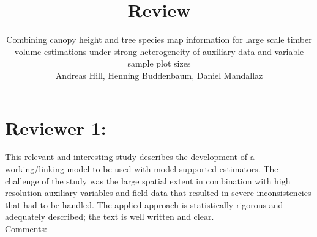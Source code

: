 \documentclass{article}
\title{Review}
\author{Combining canopy height and tree species map information for large scale timber volume estimations under strong heterogeneity of auxiliary data and variable sample plot sizes\\
Andreas Hill, Henning Buddenbaum, Daniel Mandallaz}
\begin{document}

\maketitle
\thispagestyle{empty}
\newpage

\setcounter{page}{1}

\pagestyle{fancy} %
\fancyfoot[C]{\thepage}
\setlength{\headsep}{15mm}

\newcommand{\answer}[1]{\small \color{mybrown}{#1} \color{black}}
\newcommand{\note}[1]{\textit{\small \color{amaranth} \textbf{Note:} #1} \color{black}}
\newcommand{\todo}[1]{\color{red}{#1} \color{black}}
\newcommand{\answerfin}[1]{\small \color{mygreen}{#1} \color{black}}



\section*{Reviewer 1:}

This relevant and interesting study describes the development of a working/linking model to be used with model-supported estimators. The challenge of the study was the large spatial extent in combination with high resolution auxiliary variables and field data that resulted in severe inconsistencies that had to be handled. The applied approach is statistically rigorous and adequately described; the text is well written and clear.\\

Comments:\\
\end{document}
